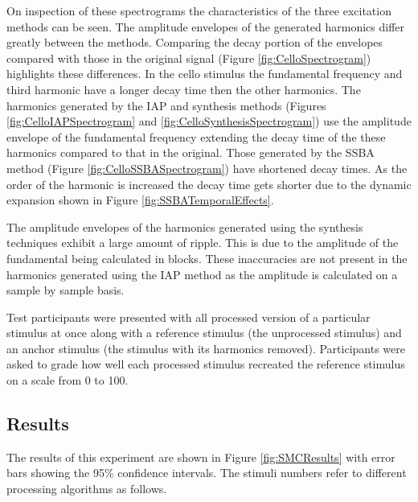 		On inspection of these spectrograms the characteristics of the three excitation methods can be seen. The
		amplitude envelopes of the generated harmonics differ greatly between the methods. Comparing the decay
		portion of the envelopes compared with those in the original signal (Figure \ref{fig:CelloSpectrogram})
		highlights these differences. In the cello stimulus the fundamental frequency and third harmonic have a
		longer decay time then the other harmonics. The harmonics generated by the IAP and synthesis methods
		(Figures \ref{fig:CelloIAPSpectrogram} and \ref{fig:CelloSynthesisSpectrogram}) use the amplitude envelope
		of the fundamental frequency extending the decay time of the these harmonics compared to that in the
		original. Those generated by the SSBA method (Figure \ref{fig:CelloSSBASpectrogram}) have shortened decay
		times. As the order of the harmonic is increased the decay time gets shorter due to the dynamic expansion
		shown in Figure \ref{fig:SSBATemporalEffects}.

		The amplitude envelopes of the harmonics generated using the synthesis techniques exhibit a large amount of
		ripple.  This is due to the amplitude of the fundamental being calculated in blocks. These inaccuracies are
		not present in the harmonics generated using the IAP method as the amplitude is calculated on a sample by
		sample basis.

		Test participants were presented with all processed version of a particular stimulus at once along with a
		reference stimulus (the unprocessed stimulus) and an anchor stimulus (the stimulus with its harmonics
		removed).  Participants were asked to grade how well each processed stimulus recreated the reference
		stimulus on a scale from 0 to 100.

	\subsection{Results}
	\label{sec:PerceptualExperiments-Reconstruction-Results}
		The results of this experiment are shown in Figure \ref{fig:SMCResults} with error bars showing the 95\%
		confidence intervals. The stimuli numbers refer to different processing algorithms as follows.


